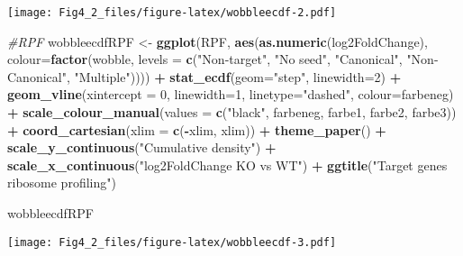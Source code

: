 \documentclass[
]{article}
\newenvironment{Shaded}{\begin{snugshade}}{\end{snugshade}}
\newcommand{\AttributeTok}[1]{\textcolor[rgb]{0.13,0.29,0.53}{#1}}
\newcommand{\CommentTok}[1]{\textcolor[rgb]{0.56,0.35,0.01}{\textit{#1}}}
\newcommand{\DecValTok}[1]{\textcolor[rgb]{0.00,0.00,0.81}{#1}}
\newcommand{\FunctionTok}[1]{\textcolor[rgb]{0.13,0.29,0.53}{\textbf{#1}}}
\newcommand{\NormalTok}[1]{#1}
\newcommand{\OtherTok}[1]{\textcolor[rgb]{0.56,0.35,0.01}{#1}}
\newcommand{\SpecialCharTok}[1]{\textcolor[rgb]{0.81,0.36,0.00}{\textbf{#1}}}
\newcommand{\StringTok}[1]{\textcolor[rgb]{0.31,0.60,0.02}{#1}}
\begin{document}
\texttt{[image: Fig4\_2\_files/figure-latex/wobbleecdf-2.pdf]}

\begin{Shaded}
\begin{Highlighting}[]
\CommentTok{\#RPF}
\NormalTok{wobbleecdfRPF }\OtherTok{\textless{}{-}} \FunctionTok{ggplot}\NormalTok{(RPF, }\FunctionTok{aes}\NormalTok{(}\FunctionTok{as.numeric}\NormalTok{(log2FoldChange), }\AttributeTok{colour=}\FunctionTok{factor}\NormalTok{(wobble, }\AttributeTok{levels =} \FunctionTok{c}\NormalTok{(}\StringTok{"Non{-}target"}\NormalTok{, }\StringTok{"No seed"}\NormalTok{, }\StringTok{"Canonical"}\NormalTok{, }\StringTok{"Non{-}Canonical"}\NormalTok{, }\StringTok{"Multiple"}\NormalTok{)))) }\SpecialCharTok{+} 
  \FunctionTok{stat\_ecdf}\NormalTok{(}\AttributeTok{geom=}\StringTok{"step"}\NormalTok{, }\AttributeTok{linewidth=}\DecValTok{2}\NormalTok{) }\SpecialCharTok{+}
  \FunctionTok{geom\_vline}\NormalTok{(}\AttributeTok{xintercept =} \DecValTok{0}\NormalTok{, }\AttributeTok{linewidth=}\DecValTok{1}\NormalTok{, }\AttributeTok{linetype=}\StringTok{"dashed"}\NormalTok{, }\AttributeTok{colour=}\NormalTok{farbeneg) }\SpecialCharTok{+}
  \FunctionTok{scale\_colour\_manual}\NormalTok{(}\AttributeTok{values =} \FunctionTok{c}\NormalTok{(}\StringTok{"black"}\NormalTok{, farbeneg, farbe1, farbe2, farbe3)) }\SpecialCharTok{+}
  \FunctionTok{coord\_cartesian}\NormalTok{(}\AttributeTok{xlim =} \FunctionTok{c}\NormalTok{(}\SpecialCharTok{{-}}\NormalTok{xlim, xlim)) }\SpecialCharTok{+} 
  \FunctionTok{theme\_paper}\NormalTok{() }\SpecialCharTok{+}
  \FunctionTok{scale\_y\_continuous}\NormalTok{(}\StringTok{"Cumulative density"}\NormalTok{) }\SpecialCharTok{+} \FunctionTok{scale\_x\_continuous}\NormalTok{(}\StringTok{"log2FoldChange KO vs WT"}\NormalTok{) }\SpecialCharTok{+}
  \FunctionTok{ggtitle}\NormalTok{(}\StringTok{"Target genes ribosome profiling"}\NormalTok{)}

\NormalTok{wobbleecdfRPF}
\end{Highlighting}
\end{Shaded}

\texttt{[image: Fig4\_2\_files/figure-latex/wobbleecdf-3.pdf]}
\end{document}
